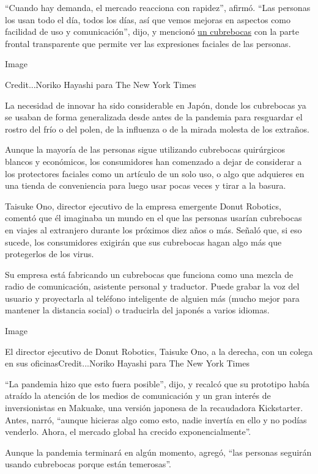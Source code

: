 ``Cuando hay demanda, el mercado reacciona con rapidez'', afirmó. ``Las
personas los usan todo el día, todos los días, así que vemos mejoras en
aspectos como facilidad de uso y comunicación'', dijo, y mencionó
\href{https://ellebabe.com/products/hg1008-elbb1}{un cubrebocas} con la
parte frontal transparente que permite ver las expresiones faciales de
las personas.

Image

Credit...Noriko Hayashi para The New York Times

La necesidad de innovar ha sido considerable en Japón, donde los
cubrebocas ya se usaban de forma generalizada desde antes de la pandemia
para resguardar el rostro del frío o del polen, de la influenza o de la
mirada molesta de los extraños.

Aunque la mayoría de las personas sigue utilizando cubrebocas
quirúrgicos blancos y económicos, los consumidores han comenzado a dejar
de considerar a los protectores faciales como un artículo de un solo
uso, o algo que adquieres en una tienda de conveniencia para luego usar
pocas veces y tirar a la basura.

Taisuke Ono, director ejecutivo de la empresa emergente Donut Robotics,
comentó que él imaginaba un mundo en el que las personas usarían
cubrebocas en viajes al extranjero durante los próximos diez años o más.
Señaló que, si eso sucede, los consumidores exigirán que sus cubrebocas
hagan algo más que protegerlos de los virus.

Su empresa está fabricando un cubrebocas que funciona como una mezcla de
radio de comunicación, asistente personal y traductor. Puede grabar la
voz del usuario y proyectarla al teléfono inteligente de alguien más
(mucho mejor para mantener la distancia social) o traducirla del japonés
a varios idiomas.

Image

El director ejecutivo de Donut Robotics, Taisuke Ono, a la derecha, con
un colega en sus oficinasCredit...Noriko Hayashi para The New York Times

``La pandemia hizo que esto fuera posible'', dijo, y recalcó que su
prototipo había atraído la atención de los medios de comunicación y un
gran interés de inversionistas en Makuake, una versión japonesa de la
recaudadora Kickstarter. Antes, narró, ``aunque hicieras algo como esto,
nadie invertía en ello y no podías venderlo. Ahora, el mercado global ha
crecido exponencialmente''.

Aunque la pandemia terminará en algún momento, agregó, ``las personas
seguirán usando cubrebocas porque están temerosas''.

